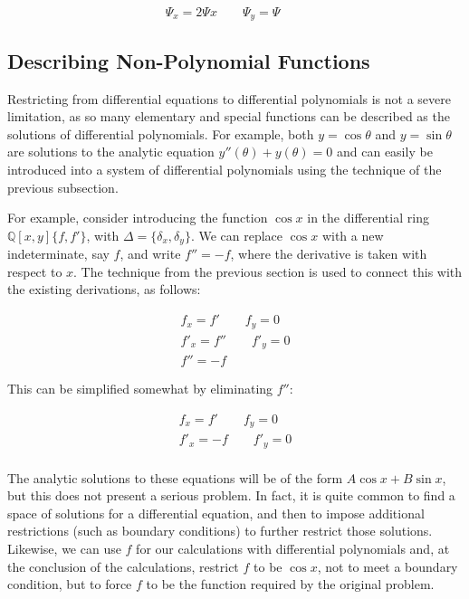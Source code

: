 \documentclass{article}
\theoremstyle{definition}
\theoremstyle{plain}
\begin{document}
\begin{equation}
\Psi_x = 2 \Psi x \qquad
\Psi_y = \Psi \qquad
\end{equation}

\subsection{Describing Non-Polynomial Functions}

Restricting from differential equations to differential
polynomials is not a severe limitation, as so many elementary and special functions
can be described as the solutions of differential polynomials.  For example, both
$y=\cos \theta$ and $y=\sin \theta$ are solutions to the
analytic equation $y''(\theta) + y(\theta) = 0$ and
can easily be introduced into a system of differential polynomials
using the technique of the previous subsection.


For example, consider introducing the function $\cos x$ in the differential ring
$\mathbb{Q}[x,y]\{f,f'\}$, with $\Delta = \{\delta_x, \delta_y\}$.
We can replace $\cos x$ with a new indeterminate, say $f$,
and write $f'' = -f$, where the derivative is taken with respect to $x$.  The technique from the
previous section is used to connect this with the existing derivations, as follows:

\begin{equation}
\begin{gathered}
f_x = f' \qquad f_y = 0 \\
f'_x = f'' \qquad f'_y = 0 \\
f'' = -f
\end{gathered}
\end{equation}

This can be simplified somewhat by eliminating $f''$:

\begin{equation}
\begin{gathered}
f_x = f' \qquad f_y = 0 \\
f'_x = -f \qquad f'_y = 0 \\
\end{gathered}
\end{equation}

The analytic solutions to these equations will be of the form $A\cos x + B\sin x$, but
this does not present a serious problem.  In fact, it is quite common to find
a space of solutions for a differential equation, and then to impose additional
restrictions (such as boundary conditions) to further restrict those solutions.
Likewise, we can use $f$ for our calculations with differential polynomials and,
at the conclusion of the calculations,
restrict $f$ to be $\cos x$, not to meet a boundary condition, but to force
$f$ to be the function required by the original problem.
\end{document}
